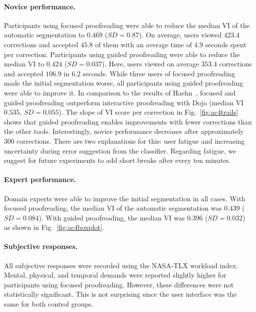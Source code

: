 \paragraph{Novice performance.} Participants using focused proofreading were able to reduce the median VI of the automatic segmentation to $0.469$ ($SD=0.87$). On average, users viewed $423.4$ corrections and accepted $45.8$ of them with an average time of $4.9$ seconds spent per correction. Participants using guided proofreading were able to reduce the median VI to $0.424$ ($SD=0.037$). Here, users viewed on average $353.4$ corrections and accepted $106.9$ in $6.2$ seconds. While three users of focused proofreading made the initial segmentation worse, all participants using guided proofreading were able to improve it. In comparison to the results of Haehn~\etal, focused and guided proofreading outperform interactive proofreading with Dojo (median VI $0.535$, $SD=0.055$). The slope of VI score per correction in Fig.~\ref{fig:ac4trails} shows that guided proofreading enables improvements with fewer corrections than the other tools. Interestingly, novice performance decreases after approximately $300$ corrections. There are two explanations for this: user fatigue and increasing uncertainty during error suggestion from the classifier. Regarding fatigue, we suggest for future experiments to add short breaks after every ten minutes.

\paragraph{Expert performance.} Domain experts were able to improve the initial segmentation in all cases. With focused proofreading, the median VI of the automatic segmentation was $0.439$ ($SD=0.084$). With guided proofreading, the median VI was $0.396$ ($SD=0.032$) as shown in Fig.~\ref{fig:ac4boxplot}.

\paragraph{Subjective responses.} All subjective responses were recorded using the NASA-TLX workload index. Mental, physical, and temporal demands were reported slightly higher for participants using focused proofreading. However, these differences were not statistically significant. This is not surprising since the user interface was the same for both control groups.

